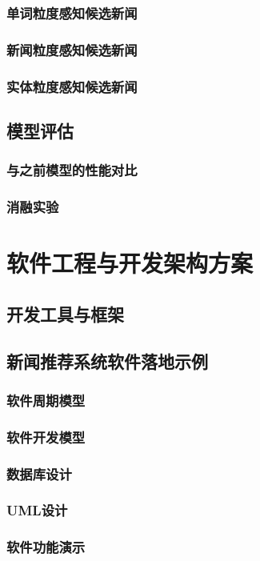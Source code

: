 \documentclass[withoutpreface,bwprint]{cumcmthesis} %
\begin{document}
	\subsubsection{ 单词粒度感知候选新闻}
	\subsubsection{ 新闻粒度感知候选新闻}
	\subsubsection{ 实体粒度感知候选新闻}
	\subsection{模型评估}
	\subsubsection{ 与之前模型的性能对比}
	\subsubsection{ 消融实验}
	\newpage
	\section{软件工程与开发架构方案}
	\subsection{开发工具与框架}
	\subsection{新闻推荐系统软件落地示例}
	\subsubsection{ 软件周期模型}
	\subsubsection{ 软件开发模型}
	\subsubsection{ 数据库设计}
	\subsubsection{ UML设计}
	\subsubsection{ 软件功能演示}
\end{document}

